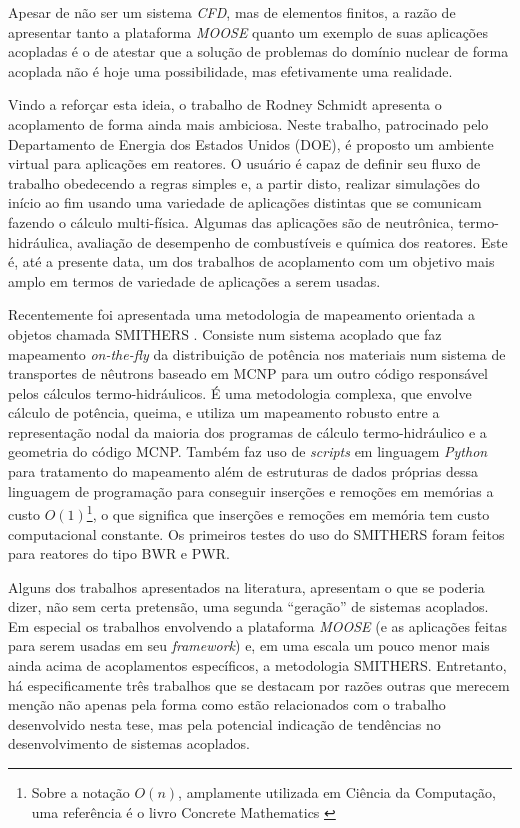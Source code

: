 Apesar de não ser um sistema \textit{CFD}, mas de elementos finitos, a razão de
apresentar tanto a plataforma \textit{MOOSE} quanto um exemplo de suas aplicações
acopladas é o de atestar que a solução de problemas do domínio nuclear de forma
acoplada não é hoje uma possibilidade, mas efetivamente uma realidade.

Vindo a reforçar esta ideia, o trabalho de Rodney Schmidt \cite{Schmidt2015} apresenta o acoplamento
de forma ainda mais ambiciosa. Neste trabalho, patrocinado pelo Departamento de Energia dos Estados
Unidos (DOE), é proposto um ambiente virtual para aplicações em reatores. O usuário é capaz de definir
seu fluxo de trabalho obedecendo a regras simples e, a partir disto, realizar simulações do início ao
fim usando uma variedade de aplicações distintas que se comunicam fazendo o cálculo multi-física. Algumas
das aplicações são de neutrônica, termo-hidráulica, avaliação de desempenho de combustíveis e química
dos reatores. Este é, até a presente data, um dos trabalhos de acoplamento com um objetivo mais amplo
em termos de variedade de aplicações a serem usadas.

Recentemente foi apresentada uma metodologia de mapeamento orientada a objetos chamada
SMITHERS \cite{Richard2015}. Consiste num sistema acoplado que faz mapeamento \textit{on-the-fly}
da distribuição de potência nos materiais num sistema de transportes de nêutrons baseado
em MCNP para um outro código responsável pelos cálculos termo-hidráulicos. É uma metodologia
complexa, que envolve cálculo de potência, queima, e utiliza um mapeamento robusto entre
a representação nodal da maioria dos programas de cálculo termo-hidráulico e a geometria
do código MCNP. Também faz uso de \textit{scripts} em linguagem \textit{Python} para
tratamento do mapeamento além de estruturas de dados próprias dessa linguagem de programação
para conseguir inserções e remoções em memórias a custo $O(1)$\footnote{Sobre a notação $O(n)$, amplamente utilizada em Ciência da Computação, uma
  referência é o livro Concrete Mathematics \cite[Seção~9.2]{Graham1994}}, o que significa
que inserções e remoções em memória tem custo computacional constante.
Os primeiros testes do uso do SMITHERS foram feitos para reatores do tipo BWR e
PWR.

Alguns dos trabalhos apresentados na literatura, apresentam o que se poderia dizer,
não sem certa pretensão, uma segunda ``geração'' de sistemas acoplados. Em especial os trabalhos
envolvendo a plataforma \textit{MOOSE} (e as aplicações feitas para serem usadas em seu
\textit{framework}) e, em uma escala um pouco menor mais ainda acima de acoplamentos específicos,
a metodologia SMITHERS. Entretanto, há especificamente três trabalhos que se destacam por razões outras que
merecem menção não apenas pela forma como estão relacionados com o trabalho desenvolvido nesta tese, mas pela
potencial indicação de tendências no desenvolvimento de sistemas acoplados.

